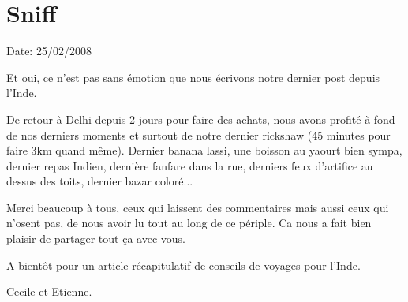 \section{Sniff}

Date: 25/02/2008

\begin{multicols}{2}

Et oui, ce n'est pas sans émotion que nous écrivons notre dernier post depuis l'Inde.

De retour à Delhi depuis 2 jours pour faire des achats, nous avons profité à fond de nos derniers moments et surtout de notre dernier rickshaw (45 minutes pour faire 3km quand même). Dernier banana lassi, une boisson au yaourt bien sympa, dernier repas Indien, dernière fanfare dans la rue, derniers feux d'artifice au dessus des toits, dernier bazar coloré...

Merci beaucoup à tous, ceux qui laissent des commentaires mais aussi ceux qui n'osent pas, de nous avoir lu tout au long de ce périple. Ca nous a fait bien plaisir de partager tout ça avec vous.

A bientôt pour un article récapitulatif de conseils de voyages pour l'Inde.

Cecile et Etienne.

\end{multicols}


